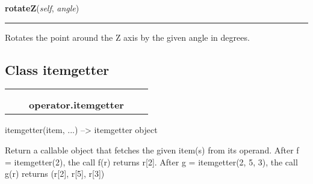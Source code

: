     \label{pygame-asteroids:polygon:Point3D:rotateZ}

    \vspace{0.5ex}

\hspace{.8\funcindent}\begin{boxedminipage}{\funcwidth}

    \raggedright \textbf{rotateZ}(\textit{self}, \textit{angle})

    \vspace{-1.5ex}

    \rule{\textwidth}{0.5\fboxrule}
\setlength{\parskip}{2ex}
    Rotates the point around the Z axis by the given angle in degrees.

\setlength{\parskip}{1ex}
    \end{boxedminipage}



\subsection{Class itemgetter}

    \label{operator:itemgetter}
\begin{tabular}{cccccc}
\multicolumn{2}{r}{\settowidth{\BCL}{object}\multirow{2}{\BCL}{object}}
&&
  \\\cline{3-3}
  &&\multicolumn{1}{c|}{}
&&
  \\
&&\multicolumn{2}{l}{\textbf{operator.itemgetter}}
\end{tabular}

itemgetter(item, ...) --{\textgreater} itemgetter object

Return a callable object that fetches the given item(s) from its operand. 
After f = itemgetter(2), the call f(r) returns r[2]. After g = 
itemgetter(2, 5, 3), the call g(r) returns (r[2], r[5], r[3])



